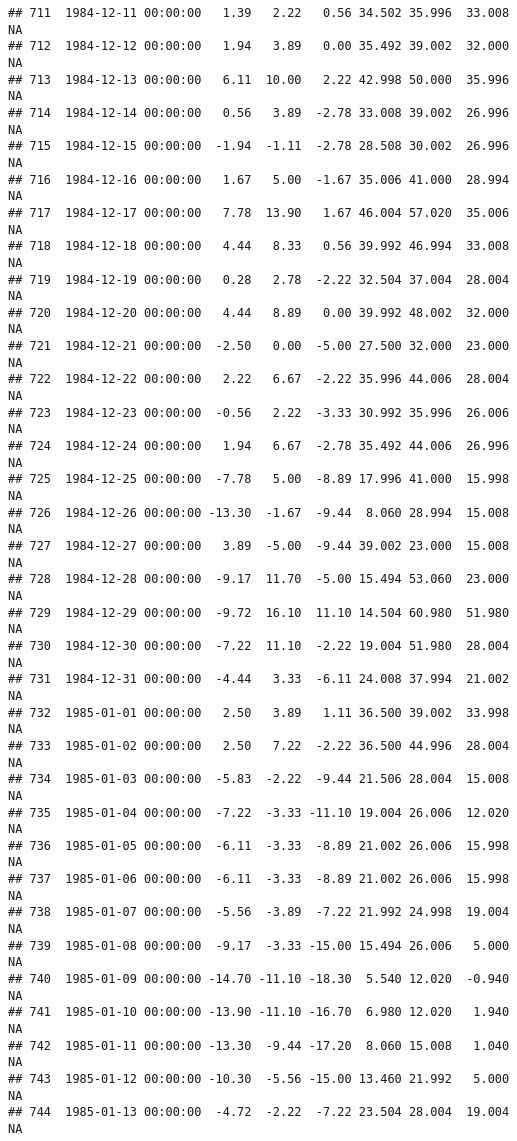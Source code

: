 \documentclass{article}\usepackage{graphicx, color}
\makeatletter
\newenvironment{kframe}{%
 \def\at@end@of@kframe{}%
 \ifinner\ifhmode%
  \def\at@end@of@kframe{\end{minipage}}%
  \begin{minipage}{\columnwidth}%
 \fi\fi%
 \def\FrameCommand##1{\hskip\@totalleftmargin \hskip-\fboxsep
 \colorbox{shadecolor}{##1}\hskip-\fboxsep
     \hskip-\linewidth \hskip-\@totalleftmargin \hskip\columnwidth}%
 \MakeFramed {\advance\hsize-\width
   \@totalleftmargin\z@ \linewidth\hsize
   \@setminipage}}%
 {\par\unskip\endMakeFramed%
 \at@end@of@kframe}
\newenvironment{knitrout}{}{} %
\makeatother
\begin{document}
\begin{knitrout}
\begin{kframe}
\begin{verbatim}
## 711  1984-12-11 00:00:00   1.39   2.22   0.56 34.502 35.996  33.008     NA
## 712  1984-12-12 00:00:00   1.94   3.89   0.00 35.492 39.002  32.000     NA
## 713  1984-12-13 00:00:00   6.11  10.00   2.22 42.998 50.000  35.996     NA
## 714  1984-12-14 00:00:00   0.56   3.89  -2.78 33.008 39.002  26.996     NA
## 715  1984-12-15 00:00:00  -1.94  -1.11  -2.78 28.508 30.002  26.996     NA
## 716  1984-12-16 00:00:00   1.67   5.00  -1.67 35.006 41.000  28.994     NA
## 717  1984-12-17 00:00:00   7.78  13.90   1.67 46.004 57.020  35.006     NA
## 718  1984-12-18 00:00:00   4.44   8.33   0.56 39.992 46.994  33.008     NA
## 719  1984-12-19 00:00:00   0.28   2.78  -2.22 32.504 37.004  28.004     NA
## 720  1984-12-20 00:00:00   4.44   8.89   0.00 39.992 48.002  32.000     NA
## 721  1984-12-21 00:00:00  -2.50   0.00  -5.00 27.500 32.000  23.000     NA
## 722  1984-12-22 00:00:00   2.22   6.67  -2.22 35.996 44.006  28.004     NA
## 723  1984-12-23 00:00:00  -0.56   2.22  -3.33 30.992 35.996  26.006     NA
## 724  1984-12-24 00:00:00   1.94   6.67  -2.78 35.492 44.006  26.996     NA
## 725  1984-12-25 00:00:00  -7.78   5.00  -8.89 17.996 41.000  15.998     NA
## 726  1984-12-26 00:00:00 -13.30  -1.67  -9.44  8.060 28.994  15.008     NA
## 727  1984-12-27 00:00:00   3.89  -5.00  -9.44 39.002 23.000  15.008     NA
## 728  1984-12-28 00:00:00  -9.17  11.70  -5.00 15.494 53.060  23.000     NA
## 729  1984-12-29 00:00:00  -9.72  16.10  11.10 14.504 60.980  51.980     NA
## 730  1984-12-30 00:00:00  -7.22  11.10  -2.22 19.004 51.980  28.004     NA
## 731  1984-12-31 00:00:00  -4.44   3.33  -6.11 24.008 37.994  21.002     NA
## 732  1985-01-01 00:00:00   2.50   3.89   1.11 36.500 39.002  33.998     NA
## 733  1985-01-02 00:00:00   2.50   7.22  -2.22 36.500 44.996  28.004     NA
## 734  1985-01-03 00:00:00  -5.83  -2.22  -9.44 21.506 28.004  15.008     NA
## 735  1985-01-04 00:00:00  -7.22  -3.33 -11.10 19.004 26.006  12.020     NA
## 736  1985-01-05 00:00:00  -6.11  -3.33  -8.89 21.002 26.006  15.998     NA
## 737  1985-01-06 00:00:00  -6.11  -3.33  -8.89 21.002 26.006  15.998     NA
## 738  1985-01-07 00:00:00  -5.56  -3.89  -7.22 21.992 24.998  19.004     NA
## 739  1985-01-08 00:00:00  -9.17  -3.33 -15.00 15.494 26.006   5.000     NA
## 740  1985-01-09 00:00:00 -14.70 -11.10 -18.30  5.540 12.020  -0.940     NA
## 741  1985-01-10 00:00:00 -13.90 -11.10 -16.70  6.980 12.020   1.940     NA
## 742  1985-01-11 00:00:00 -13.30  -9.44 -17.20  8.060 15.008   1.040     NA
## 743  1985-01-12 00:00:00 -10.30  -5.56 -15.00 13.460 21.992   5.000     NA
## 744  1985-01-13 00:00:00  -4.72  -2.22  -7.22 23.504 28.004  19.004     NA

\end{verbatim}
\end{kframe}
\end{knitrout}
\end{document}
